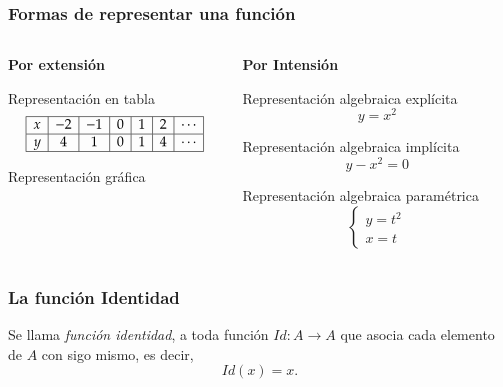 \begin{frame}
	\frametitle{Formas de representar una función}
	\begin{columns}
		\begin{column}{.48\textwidth}
			\textbf{Por extensión}
			\begin{block}{Representación en tabla}
				\[
					\begin{array}{|c|c|c|c|c|c|c|}
						\hline
						x & -2 & -1 & 0 & 1 & 2 & \cdots \\
						\hline
						y & 4  & 1  & 0 & 1 & 4 & \cdots \\
						\hline
					\end{array}
				\]
			\end{block}
			\begin{block}{Representación gráfica}
				\begin{center}
					\scalebox{0.7}{}
				\end{center}
			\end{block}
		\end{column}
		\begin{column}{.48\textwidth}
			\textbf{Por Intensión}
			\begin{block}{Representación algebraica explícita}
				\[y=x^2\]
			\end{block}
			\begin{block}{Representación algebraica implícita}
				\[y-x^2=0\]
			\end{block}
			\begin{block}{Representación algebraica paramétrica}
				\[  
					\begin{cases}
						y=t^2 \\
						x=t   
					\end{cases}
				\]
			\end{block}
		\end{column}   
	\end{columns}
\end{frame} 


\begin{frame}
	\frametitle{La función Identidad}
	\begin{definicion}
		Se llama \emph{función identidad}, a toda función $Id: A\rightarrow A$ que asocia cada elemento de $A$ con sigo mismo, es decir, 
		\[Id(x)=x.\]
	\end{definicion}
	\begin{center}
		\scalebox{1}{}
	\end{center}
\end{frame} 



